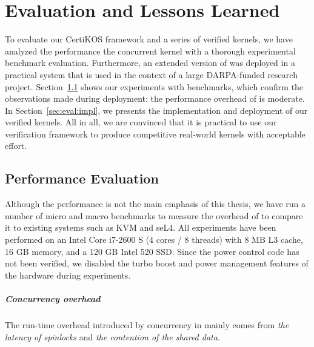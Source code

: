 
\chapter{Evaluation and Lessons Learned}
\label{chap-eval}
To evaluate
our CertiKOS framework
and a series of verified kernels,
we have analyzed the performance  the  \cCTOS{} concurrent kernel
with a thorough experimental benchmark evaluation.
Furthermore, an extended version of \cCTOS{}
was deployed in a practical system that is used in the context of a
large DARPA-funded research project. 
Section~\ref{sec:eval:perform} shows our experiments with benchmarks, which
confirm the observations made during deployment: the performance
overhead of \cCTOS{} is moderate. 
In Section~\ref{sec:eval:impl},
we presents the implementation and deployment of
our verified kernels.
All in all, we are convinced that it is
practical to use our verification framework to produce competitive
real-world kernels with acceptable effort.


\section{Performance Evaluation} 
\label{sec:eval:perform}

Although the performance is not the main emphasis of this thesis, we
have run a number of micro and macro benchmarks to measure the
overhead of {\cCTOS}
to compare it to existing systems such
as KVM and seL4. All experiments have been performed on an Intel Core
i7-2600 S (4 cores / 8 threads) with 8 MB L3 cache, 16 GB memory, and
a 120 GB Intel 520 SSD. Since the power control code has not been
verified, we disabled the turbo boost and power management features of
the hardware during experiments.


\paragraph{Concurrency overhead} The run-time overhead introduced by concurrency
in {\cCTOS} mainly comes from \emph{the latency of spinlocks} and \emph{the
	contention of the shared data}. 

